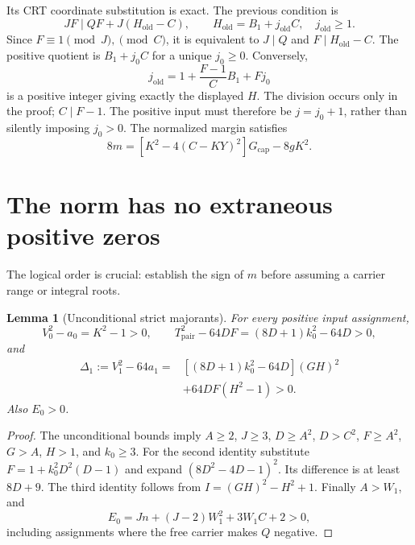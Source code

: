 \documentclass[11pt,a4paper]{article}
\newtheorem{lemma}[theorem]{Lemma}
\theoremstyle{remark}
\newcommand{\Gcap}{G_{\mathrm{cap}}}
\begin{document}
Its CRT coordinate substitution is exact. The previous condition is
\[
 JF\mid QF+J(H_{\mathrm{old}}-C),\qquad
 H_{\mathrm{old}}=B_1+j_{\mathrm{old}}C,\quad j_{\mathrm{old}}\ge1 .
\]
Since \(F\equiv1\pmod J,\pmod C\), it is equivalent to \(J\mid Q\)
and \(F\mid H_{\mathrm{old}}-C\).
The positive quotient is \(B_1+j_0C\) for a unique \(j_0\ge0\).
Conversely,
\[
 j_{\mathrm{old}}=1+\frac{F-1}{C}B_1+Fj_0
\]
is a positive integer giving exactly the displayed \(H\).
The division occurs only in the proof; \(C\mid F-1\).
The positive input must therefore be \(j=j_0+1\), rather than
silently imposing \(j_0>0\). The normalized margin satisfies
\[
 8m=[K^2-4(C-KY)^2]\Gcap-8gK^2.
\]

\section{The norm has no extraneous positive zeros}
\label{sec:norm-proof}

The logical order is crucial: establish the sign of \(m\) before
assuming a carrier range or integral roots.

\begin{lemma}[Unconditional strict majorants]
For every positive input assignment,
\[
 V_0^2-a_0=K^2-1>0,\qquad
 T_{\mathrm{pair}}^2-64DF=(8D+1)k_0^2-64D>0,
\]
and
\begin{equation}
\begin{split}
 \Delta_1:=V_1^2-64a_1
 ={}&[(8D+1)k_0^2-64D](GH)^2\\
   &+64DF(H^2-1)>0.
\end{split}
\label{eq:defect}
\end{equation}
Also \(E_0>0\).
\end{lemma}
\begin{proof}
The unconditional bounds imply
\(A\ge2\), \(J\ge3\), \(D\ge A^2\), \(D>C^2\),
\(F\ge A^2\), \(G>A\), \(H>1\), and \(k_0\ge3\).
For the second identity substitute
\(F=1+k_0^2D^2(D-1)\) and expand
\((8D^2-4D-1)^2\). Its difference is at least \(8D+9\).
The third identity follows from \(I=(GH)^2-H^2+1\).
Finally \(A>W_1\), and
\[
 E_0=Jn+(J-2)W_1^2+3W_1C+2>0,
\]
including assignments where the free carrier makes \(Q\) negative.
\end{proof}
\end{document}

